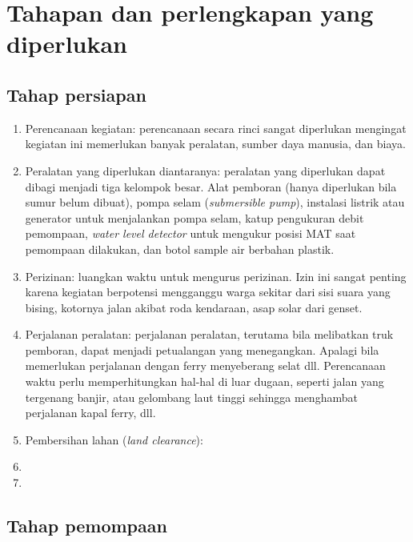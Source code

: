 \section{Tahapan dan perlengkapan yang diperlukan}

\subsection{Tahap persiapan}

\begin{enumerate}
\item Perencanaan kegiatan: perencanaan secara rinci sangat diperlukan mengingat kegiatan ini memerlukan banyak peralatan, sumber daya manusia, dan biaya.
\item Peralatan yang diperlukan diantaranya: peralatan yang diperlukan dapat dibagi menjadi tiga kelompok besar. Alat pemboran (hanya diperlukan bila sumur belum dibuat), pompa selam (\textit{submersible pump}), instalasi listrik atau generator untuk menjalankan pompa selam, katup pengukuran debit pemompaan, \textit{water level detector} untuk mengukur posisi MAT saat pemompaan dilakukan, dan botol sample air berbahan plastik.

\item Perizinan: luangkan waktu untuk mengurus perizinan. Izin ini sangat penting karena kegiatan berpotensi mengganggu warga sekitar dari sisi suara yang bising, kotornya jalan akibat roda kendaraan, asap solar dari genset.

\item Perjalanan peralatan: perjalanan peralatan, terutama bila melibatkan truk pemboran, dapat menjadi petualangan yang menegangkan. Apalagi bila memerlukan perjalanan dengan ferry menyeberang selat dll. Perencanaan waktu perlu memperhitungkan hal-hal di luar dugaan, seperti jalan yang tergenang banjir, atau gelombang laut tinggi sehingga menghambat perjalanan kapal ferry, dll.

\item Pembersihan lahan (\textit{land clearance}):

\item


\item 

\end{enumerate}




\subsection{Tahap pemompaan}





